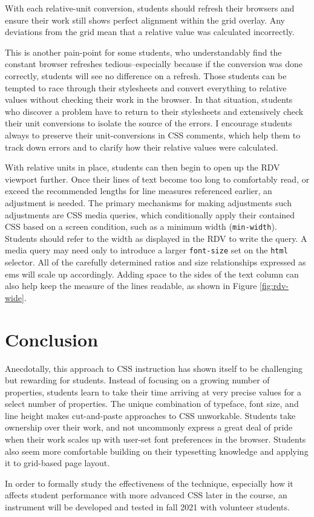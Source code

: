 \documentclass[sigplan,screen]{acmart}
\begin{document}
With each relative-unit conversion, students should refresh their browsers and ensure their work still shows perfect alignment within the  grid overlay. Any deviations from the grid mean that a relative value was calculated incorrectly.

This is another pain-point for some students, who understandably find the constant browser refreshes tedious--especially because if the conversion was done correctly, students will see no difference on a refresh. Those students can be tempted to race through their stylesheets and convert everything to relative values without checking their work in the browser. In that situation, students who discover a problem have to return to their stylesheets and extensively check their unit conversions to isolate the source of the errors. I encourage students always to preserve their unit-conversions in CSS comments, which help them to track down errors and to clarify how their relative values were calculated.

With relative units in place, students can then begin to open up the RDV viewport further. Once their lines of text become too long to comfortably read, or exceed the recommended lengths for line measures referenced earlier, an adjustment is needed. The primary mechanisms for making adjustments such adjustments are CSS media queries, which conditionally apply their contained CSS based on a screen condition, such as a minimum width (\verb|min-width|). Students should refer to the width as displayed in the RDV to write the query. A media query may need only to introduce a larger \verb|font-size| set on the \verb|html| selector. All of the carefully determined ratios and size relationships expressed as ems will scale up accordingly. Adding space to the sides of the text column can also help keep the measure of the lines readable, as shown in Figure \ref{fig:rdv-wide}.

\section{Conclusion}

Anecdotally, this approach to CSS instruction has shown itself to be challenging but rewarding for students. Instead of focusing on a growing number of properties, students learn to take their time arriving at very precise values for a select number of properties. The unique combination of typeface, font size, and line height makes cut-and-paste approaches to CSS unworkable. Students take ownership over their work, and not uncommonly express a great deal of pride when their work scales up with user-set font preferences in the browser. Students also seem more comfortable building on their typesetting knowledge and applying it to grid-based page layout.

In order to formally study the effectiveness of the technique, especially  how it affects student performance with more advanced CSS later in the course, an instrument will be developed and tested in fall 2021 with volunteer students.



\end{document}
